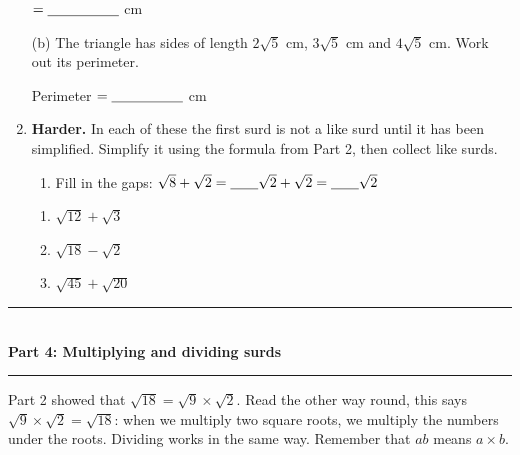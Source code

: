 \documentclass[12pt,a4paper]{article}
\newcommand{\ansline}[1][2.2cm]{\underline{\hspace{#1}}}
\newcommand{\gap}{\underline{\hspace{0.7cm}}}
\newcommand{\heading}[1]{%
  \vspace{2pt}
  {\color{blue!45!black}\rule{\linewidth}{1pt}}\\[1pt]
  {\large\bfseries #1}\\[-6pt]
  {\color{blue!45!black}\rule{\linewidth}{0.4pt}}
  \vspace{2pt}}
\newcommand{\parttitle}[2]{\heading{Part #1: #2}}
\begin{document}
\begin{enumerate}[resume]
\begin{minipage}[t]{0.48\linewidth}
\vspace{10pt}
\hspace*{4.9em}$=\ansline[1.8cm]$ cm
\end{minipage}\hfill
\begin{minipage}[t]{0.48\linewidth}
\raggedright
(b) The triangle has sides of length $2\sqrt{5}$ cm, $3\sqrt{5}$ cm and
$4\sqrt{5}$ cm. Work out its perimeter.

\vspace{4pt}
\centering
{}

\vspace{4em}
\raggedright
Perimeter $=\ansline[1.8cm]$ cm
\end{minipage}

\vspace{1.5em}

\item \textbf{Harder.} In each of these the first surd is not a like surd
until it has been simplified. Simplify it using the formula from Part 2, then
collect like surds.
\begin{enumerate}
  \item Fill in the gaps: \quad
        $\sqrt{8}+\sqrt{2}=\gap\sqrt{2}+\sqrt{2}=\gap\sqrt{2}$
\end{enumerate}
\begin{multicols}{3}
\begin{enumerate}[resume]
  \item $\sqrt{12}+\sqrt{3}$
  \item $\sqrt{18}-\sqrt{2}$
  \item $\sqrt{45}+\sqrt{20}$
\end{enumerate}
\end{multicols}
\vspace{9em}

\end{enumerate}

\newpage

\parttitle{4}{Multiplying and dividing surds}

Part 2 showed that $\sqrt{18}=\sqrt{9}\times\sqrt{2}$. Read the other way
round, this says $\sqrt{9}\times\sqrt{2}=\sqrt{18}$: when we multiply two
square roots, we multiply the numbers under the roots. Dividing works in the
same way. Remember that $ab$ means $a\times b$.
\end{document}

